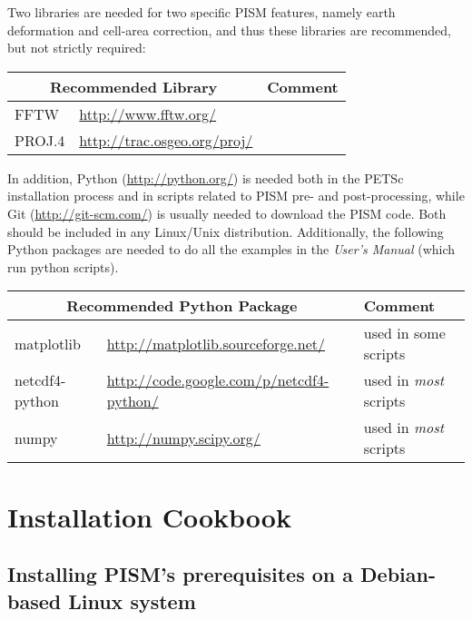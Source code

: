 \documentclass[titlepage,letterpaper,final]{scrartcl}
\begin{document}
Two libraries are needed for two specific PISM features, namely earth deformation 
and cell-area correction, and thus these libraries are recommended, but not strictly required: \bigskip

\begin{center}
  \begin{tabular}{lll}
    \toprule
    \multicolumn{2}{c}{\textbf{Recommended Library}} & \textbf{Comment}\\
    \midrule
    FFTW & \url{http://www.fftw.org/} & \\
    PROJ.4 & \url{http://trac.osgeo.org/proj/} & \\
   \bottomrule
  \end{tabular}
\end{center}

\bigskip

In addition, Python (\url{http://python.org/}) is needed both in the PETSc installation process and in scripts related to PISM pre- and post-processing, while Git (\url{http://git-scm.com/}) is usually needed to download the PISM code.  Both should be included in any Linux/Unix distribution.  Additionally, the following Python packages are needed to do all the examples in the \emph{User's Manual} (which run python scripts).
\bigskip

\begin{center}
  \begin{tabular}{lll}
    \toprule
    \multicolumn{2}{c}{\textbf{Recommended Python Package}} & \textbf{Comment}\\
    \midrule
    matplotlib & \url{http://matplotlib.sourceforge.net/} & used in some scripts \\
    netcdf4-python & \url{http://code.google.com/p/netcdf4-python/} & used in \emph{most} scripts \\
    numpy & \url{http://numpy.scipy.org/} & used in \emph{most} scripts \\
   \bottomrule
  \end{tabular}
\end{center}


\section{Installation Cookbook}\label{sec:cookbook}

\subsection{Installing PISM's prerequisites on a Debian-based Linux system} \label{subsec:debian}
\end{document}
